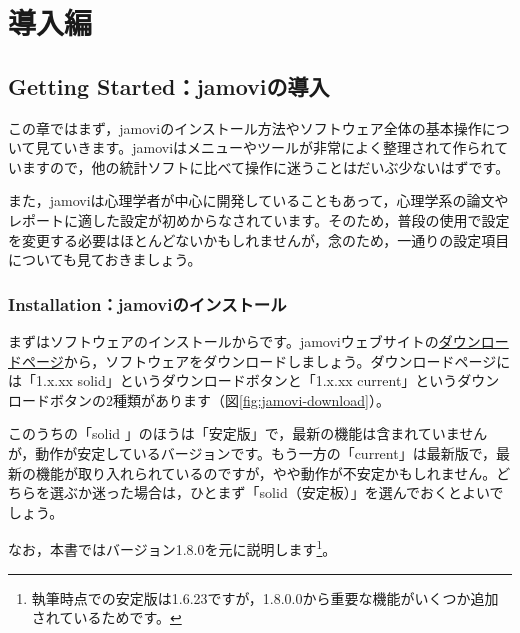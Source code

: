 \documentclass[
  12pt,
  a5jpaper,
  lualatex, ja=standard]{bxjsbook}
\begin{document}
\hypertarget{part-one}{%
\part{導入編}\label{part-one}}

\hypertarget{ch:introduction}{%
\chapter{Getting Started：jamoviの導入}\label{ch:introduction}}

この章ではまず，jamoviのインストール方法やソフトウェア全体の基本操作について見ていきます。jamoviはメニューやツールが非常によく整理されて作られていますので，他の統計ソフトに比べて操作に迷うことはだいぶ少ないはずです。

また，jamoviは心理学者が中心に開発していることもあって，心理学系の論文やレポートに適した設定が初めからなされています。そのため，普段の使用で設定を変更する必要はほとんどないかもしれませんが，念のため，一通りの設定項目についても見ておきましょう。

\hypertarget{sec:intro-install}{%
\section{Installation：jamoviのインストール}\label{sec:intro-install}}

まずはソフトウェアのインストールからです。jamoviウェブサイトの\href{https://www.jamovi.org/download.html}{ダウンロードページ}から，ソフトウェアをダウンロードしましょう。ダウンロードページには「1.x.xx solid」というダウンロードボタンと「1.x.xx current」というダウンロードボタンの2種類があります（図\ref{fig:jamovi-download}）。

このうちの「solid 」のほうは「安定版」で，最新の機能は含まれていませんが，動作が安定しているバージョンです。もう一方の「current」は最新版で，最新の機能が取り入れられているのですが，やや動作が不安定かもしれません。どちらを選ぶか迷った場合は，ひとまず「solid（安定板）」を選んでおくとよいでしょう。

なお，本書ではバージョン1.8.0を元に説明します\footnote{執筆時点での安定版は1.6.23ですが，1.8.0.0から重要な機能がいくつか追加されているためです。}。
\end{document}
